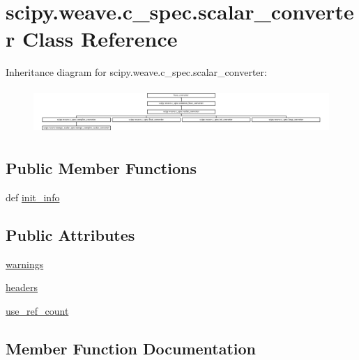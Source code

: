 \hypertarget{classscipy_1_1weave_1_1c__spec_1_1scalar__converter}{}\section{scipy.\+weave.\+c\+\_\+spec.\+scalar\+\_\+converter Class Reference}
\label{classscipy_1_1weave_1_1c__spec_1_1scalar__converter}
Inheritance diagram for scipy.\+weave.\+c\+\_\+spec.\+scalar\+\_\+converter\+:\begin{figure}[H]
\begin{center}
\leavevmode
\includegraphics[height=1.724138cm]{classscipy_1_1weave_1_1c__spec_1_1scalar__converter}
\end{center}
\end{figure}
\subsection*{Public Member Functions}
\begin{DoxyCompactItemize}
\item 
def \hyperlink{classscipy_1_1weave_1_1c__spec_1_1scalar__converter_ae107360423750c7e8ea4d63712c7955b}{init\+\_\+info}
\end{DoxyCompactItemize}
\subsection*{Public Attributes}
\begin{DoxyCompactItemize}
\item 
\hyperlink{classscipy_1_1weave_1_1c__spec_1_1scalar__converter_a31fc5a16a8a16e16fdd11dbae154be9e}{warnings}
\item 
\hyperlink{classscipy_1_1weave_1_1c__spec_1_1scalar__converter_a99cd8236387f2b51768b6818123018ac}{headers}
\item 
\hyperlink{classscipy_1_1weave_1_1c__spec_1_1scalar__converter_a3f30122f7fbed659a742be0de4cf6f21}{use\+\_\+ref\+\_\+count}
\end{DoxyCompactItemize}


\subsection{Member Function Documentation}
\hypertarget{classscipy_1_1weave_1_1c__spec_1_1scalar__converter_ae107360423750c7e8ea4d63712c7955b}{}
